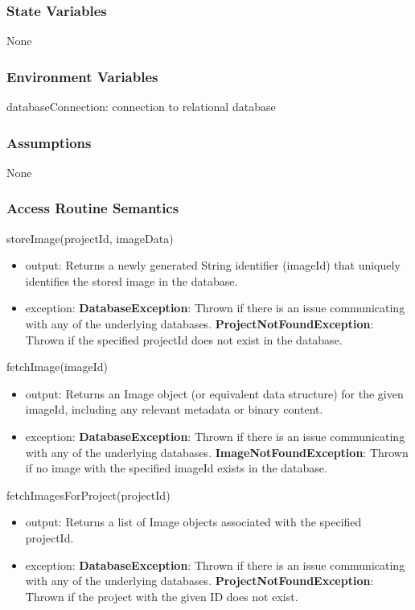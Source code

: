 \documentclass[12pt, titlepage]{article}
\begin{document}
    \subsubsection{State Variables}
        None

    \subsubsection{Environment Variables}
        databaseConnection: connection to relational database

    \subsubsection{Assumptions}
        None

    \subsubsection{Access Routine Semantics}
        \noindent storeImage(projectId, imageData)
        \begin{itemize}
            \item output: Returns a newly generated String identifier (imageId) that uniquely identifies the stored image in the database.
            \item exception: \textbf{DatabaseException}: Thrown if there is an issue communicating with any of the underlying databases. \textbf{ProjectNotFoundException}: Thrown if the specified projectId does not exist in the database.
        \end{itemize}
        \noindent fetchImage(imageId)
        \begin{itemize}
            \item output: Returns an Image object (or equivalent data structure) for the given imageId, including any relevant metadata or binary content.
            \item exception: \textbf{DatabaseException}: Thrown if there is an issue communicating with any of the underlying databases. 
            \textbf{ImageNotFoundException}: Thrown if no image with the specified imageId exists in the database.
        \end{itemize}
        \noindent fetchImagesForProject(projectId)
        \begin{itemize}
            \item output: Returns a list of Image objects associated with the specified projectId.
            \item exception: \textbf{DatabaseException}: Thrown if there is an issue communicating with any of the underlying databases. \textbf{ProjectNotFoundException}: Thrown if the project with the given ID does not exist.
        \end{itemize}
\end{document}
